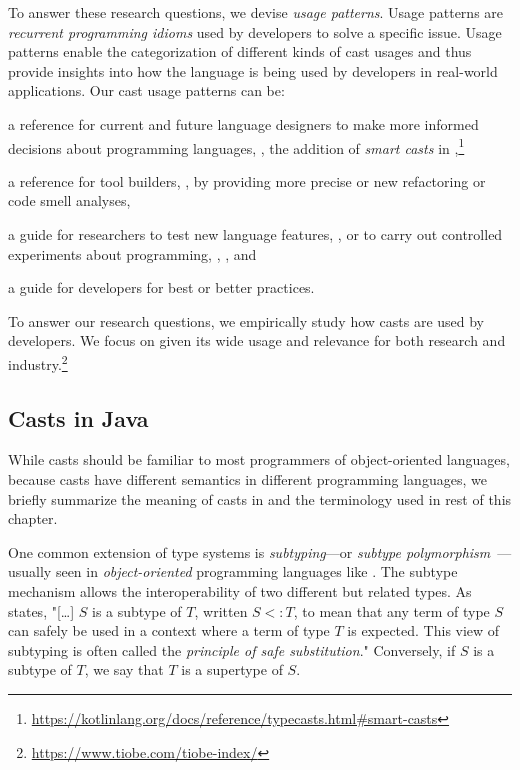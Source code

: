 To answer these research questions, we devise
\emph{usage patterns}.
Usage patterns are \emph{recurrent programming idioms} used by developers to solve a specific issue.
Usage patterns enable the categorization of different kinds of cast usages and
thus provide insights into how the language is being used by developers in real-world applications.
Our cast usage patterns can be:
\begin{inparaenum}[(1)]
\item a reference for current and future language designers
to make more informed decisions about programming languages,
\eg{},
the addition of \emph{smart casts} in ,\footnote{\url{https://kotlinlang.org/docs/reference/typecasts.html\#smart-casts}}
\item a reference for tool builders, \eg{}, by providing more precise or new
  refactoring or code smell analyses,
\item a guide for researchers to test new language features, \eg{}, \cite{wintherGuardedTypePromotion2011} or to carry out controlled
  experiments about programming, \eg{}, \cite{stuchlikStaticVsDynamic2011}, and
\item a guide for developers for best or better practices.
\end{inparaenum}
To answer our research questions,
we empirically study how casts
are used by developers.
We focus on \java{} given its wide usage and relevance for both
research and industry.\footnote{\url{https://www.tiobe.com/tiobe-index/}}

\subsection*{Casts in Java}

While casts should be familiar to most programmers of object-oriented languages, 
because casts have different semantics in different programming languages,
we briefly summarize the meaning of casts in \java{} and the terminology used in rest of this chapter.

One common extension of type systems is
\emph{subtyping}---or \emph{subtype polymorphism}~\citep{cardelliUnderstandingTypesData1985}---usually seen in \emph{object-oriented} programming languages like \java{}.
The subtype mechanism allows the interoperability of two different but related types.
As~\cite{pierceTypesProgrammingLanguages2002} states,
"[\ldots] $S$ is a subtype of $T$, written $S <: T$,
to mean that any term of type $S$ can safely be used in a context where a term of type $T$ is expected.
This view of subtyping is often called the \emph{principle of safe substitution}."
Conversely, if $S$ is a subtype of $T$, we say that $T$ is a supertype of $S$.

